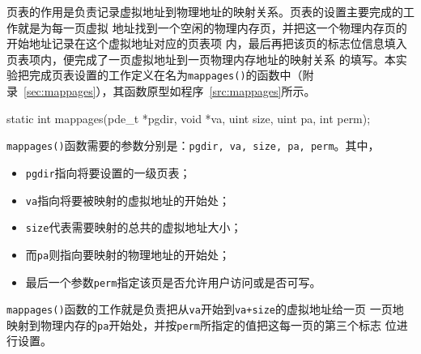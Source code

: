 \documentclass{swfcthesismscctex}
\begin{document}
页表的作用是负责记录虚拟地址到物理地址的映射关系。页表的设置主要完成的工作就是为每一页虚拟
地址找到一个空闲的物理内存页，并把这一个物理内存页的开始地址记录在这个虚拟地址对应的页表项
内，最后再把该页的标志位信息填入页表项内，便完成了一页虚拟地址到一页物理内存地址的映射关系
的填写。本实验把完成页表设置的工作定义在名为\texttt{mappages()}的函数中（附
录~\ref{sec:mappages}），其函数原型如程序~\ref{src:mappages}所示。

\begin{listing}%
  \begin{codeblock}
\begin{ccode}
static int
mappages(pde_t *pgdir, void *va, uint size, uint pa, int perm);
\end{ccode}
  \end{codeblock}
  \label{src:mappages}
\end{listing}

\texttt{mappages()}函数需要的参数分别是：\texttt{pgdir, va,
  size, pa, perm}。其中，
\begin{itemize}
\item \texttt{pgdir}指向将要设置的一级页表；
\item \texttt{va}指向将要被映射的虚拟地址的开始处；
\item \texttt{size}代表需要映射的总共的虚拟地址大小；
\item 而\texttt{pa}则指向要映射的物理地址的开始处；
\item 最后一个参数\texttt{perm}指定该页是否允许用户访问或是否可写。
\end{itemize}

\texttt{mappages()}函数的工作就是负责把从\texttt{va}开始到\texttt{va+size}的虚拟地址给一页
一页地映射到物理内存的\texttt{pa}开始处，并按\texttt{perm}所指定的值把这每一页的第三个标志
位进行设置。
\end{document}
